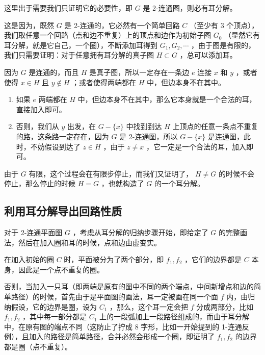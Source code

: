 \documentclass[11pt, a4paper]{ctexart}
\begin{document}
这里出于需要我们只证明它的必要性，即 $G$ 是 2-连通图，则必有耳分解。

这是因为，既然 $G$ 是 2-连通的，它必然有一个简单回路 $C$ （至少有 3 个顶点），我们取任意一个回路（点和边不重复）上的顶点和边作为初始子图 $G_0$ （显然它有耳分解，就是它自己，一个圈），不断添加耳得到 $G_1,G_2,\cdots$ ，由于图是有限的，我们只需要证明：对于任意拥有耳分解的真子图 $H\subset G$ ，总可以添加耳。

因为 $G$ 是连通的，而且 $H$ 是真子图，所以一定存在一条边 $e$ 连接 $x$ 和 $y$ ，或者使得 $x\in H$ 且 $y\notin H$ ；或者使得两端都在 $H$ 中，但边本身不在其中。

\begin{enumerate}
    \item 如果 $e$ 两端都在 $H$ 中，但边本身不在其中，那么它本身就是一个合法的耳，直接加入即可。
    \item 否则，我们从 $y$ 出发，在 $G-\{x\}$ 中找到到达 $H$ 上顶点的任意一条点不重复的路，这条路一定存在，因为 $G$ 是 2-连通图，所以 $G-\{x\}$ 是连通图，此时，不妨假设到达了 $z\in H$ ，由于 $z\ne x$ ，它一定是一个合法的耳，加入即可。
\end{enumerate}

由于 $G$ 有限，这个过程会在有限步停止，而我们又证明了， $H\ne G$ 的时候不会停止，那么停止的时候 $H= G$ ，也就构造了 $G$ 的一个耳分解。

\subsection{利用耳分解导出回路性质}

对于 2-连通平面图 $G$ ，考虑从耳分解的归纳步骤开始，即给定了 $G$ 的完整画法，然后在加入圈和耳的时候，点和边由虚变实。

在加入初始的圈 $C$ 时，平面被分为了两个部分，即 $f_1,f_2$ ，它们的边界都是 $C$ 本身，因此是一个点不重复的圈。

否则，当加入一只耳（即两端是原有的图中不同的两个端点，中间新增点和边的简单路径）的时候，首先由于是平面图的画法，耳一定被画在同一个面 $f$ 内，由归纳假设，它的边界是圈，设为 $C_1$ ，那么，这个耳一定会把 $f$ 分成两部分，比如 $f_1,f_2$ ，其中每一部分都是 $C_1$ 上的一段弧加上一段路径组成的，而由于耳分解中，在原有图的端点不同（这防止了拧成 8 字形，比如一开始提到的 1-连通反例），且加入的路径是简单路径，合并必然会形成一个圈，即证明了 $f_1,f_2$ 的边界都是圈（点不重复）。
\end{document}
